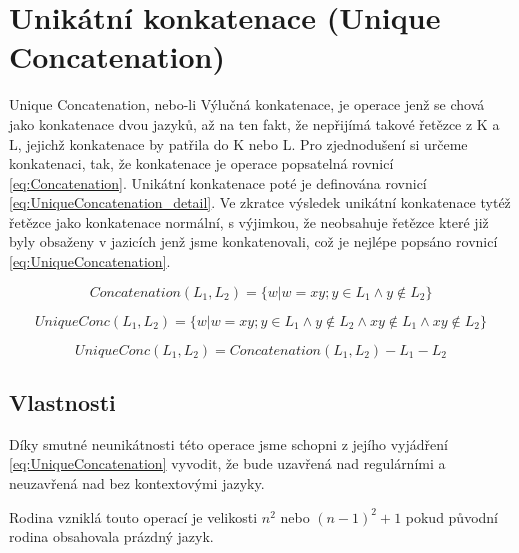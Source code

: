\section{Unikátní konkatenace (Unique Concatenation)}
Unique Concatenation, nebo-li Výlučná konkatenace, je operace jenž se chová jako konkatenace dvou jazyků, až na ten fakt, že nepřijímá takové řetězce z K a L, jejichž konkatenace by patřila do K nebo L.
Pro zjednodušení si určeme konkatenaci, tak, že konkatenace je operace popsatelná rovnicí \ref{eq:Concatenation}.
Unikátní konkatenace poté je definována rovnicí \ref{eq:UniqueConcatenation_detail}.
Ve zkratce výsledek unikátní konkatenace tytéž řetězce jako konkatenace normální, s výjimkou, že neobsahuje řetězce které již byly obsaženy v jazicích jenž jsme konkatenovali, což je nejlépe popsáno rovnicí  \ref{eq:UniqueConcatenation}.

\begin{equation}\label{eq:Concatenation}
Concatenation(L_{1}, L_{2}) = \{w|w=xy; y\in L_{1}\land  y\notin L_{2}\}
\end{equation}

\begin{equation}\label{eq:UniqueConcatenation_detail}
UniqueConc(L_{1}, L_{2}) = \{w|w=xy; y\in L_{1}\land  y\notin L_{2} \land xy \notin L_{1} \land xy \notin L_{2} \}
\end{equation}

\begin{equation}\label{eq:UniqueConcatenation}
UniqueConc(L_{1}, L_{2}) = Concatenation(L_{1}, L_{2}) - L_{1} - L_{2}
\end{equation}

\subsection{Vlastnosti}
Díky smutné neunikátnosti této operace jsme schopni z jejího vyjádření \ref{eq:UniqueConcatenation} vyvodit, že bude uzavřená nad regulárními a neuzavřená nad bez kontextovými jazyky.

Rodina vzniklá touto operací je velikosti $n^2$ nebo $(n-1)^2+1$ pokud původní rodina obsahovala prázdný jazyk. 
